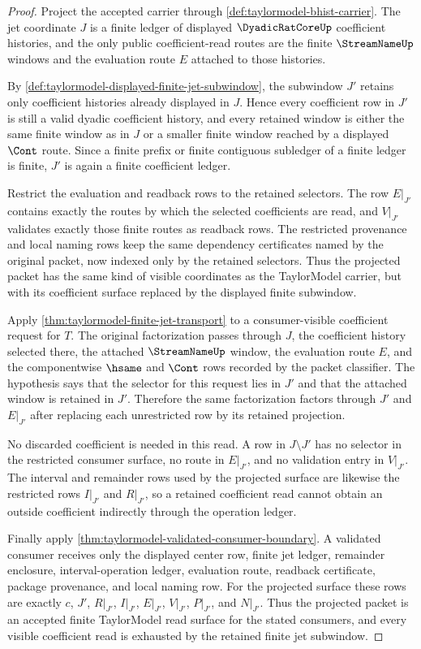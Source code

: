 \begin{proof}
Project the accepted carrier through \autoref{def:taylormodel-bhist-carrier}. The jet coordinate $J$ is a finite ledger of displayed $\DyadicRatCoreUp$ coefficient histories, and the only public coefficient-read routes are the finite $\StreamNameUp$ windows and the evaluation route $E$ attached to those histories.

By \autoref{def:taylormodel-displayed-finite-jet-subwindow}, the subwindow $J'$ retains only coefficient histories already displayed in $J$. Hence every coefficient row in $J'$ is still a valid dyadic coefficient history, and every retained window is either the same finite window as in $J$ or a smaller finite window reached by a displayed $\Cont$ route. Since a finite prefix or finite contiguous subledger of a finite ledger is finite, $J'$ is again a finite coefficient ledger.

Restrict the evaluation and readback rows to the retained selectors. The row $E\vert_{J'}$ contains exactly the routes by which the selected coefficients are read, and $V\vert_{J'}$ validates exactly those finite routes as readback rows. The restricted provenance and local naming rows keep the same dependency certificates named by the original packet, now indexed only by the retained selectors. Thus the projected packet has the same kind of visible coordinates as the TaylorModel carrier, but with its coefficient surface replaced by the displayed finite subwindow.

Apply \autoref{thm:taylormodel-finite-jet-transport} to a consumer-visible coefficient request for $T$. The original factorization passes through $J$, the coefficient history selected there, the attached $\StreamNameUp$ window, the evaluation route $E$, and the componentwise $\hsame$ and $\Cont$ rows recorded by the packet classifier. The hypothesis says that the selector for this request lies in $J'$ and that the attached window is retained in $J'$. Therefore the same factorization factors through $J'$ and $E\vert_{J'}$ after replacing each unrestricted row by its retained projection.

No discarded coefficient is needed in this read. A row in $J\setminus J'$ has no selector in the restricted consumer surface, no route in $E\vert_{J'}$, and no validation entry in $V\vert_{J'}$. The interval and remainder rows used by the projected surface are likewise the restricted rows $I\vert_{J'}$ and $R\vert_{J'}$, so a retained coefficient read cannot obtain an outside coefficient indirectly through the operation ledger.

Finally apply \autoref{thm:taylormodel-validated-consumer-boundary}. A validated consumer receives only the displayed center row, finite jet ledger, remainder enclosure, interval-operation ledger, evaluation route, readback certificate, package provenance, and local naming row. For the projected surface these rows are exactly $c$, $J'$, $R\vert_{J'}$, $I\vert_{J'}$, $E\vert_{J'}$, $V\vert_{J'}$, $P\vert_{J'}$, and $N\vert_{J'}$. Thus the projected packet is an accepted finite TaylorModel read surface for the stated consumers, and every visible coefficient read is exhausted by the retained finite jet subwindow.
\end{proof}

